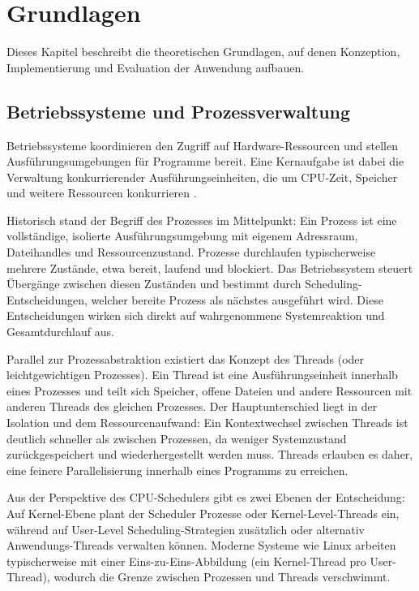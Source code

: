 \chapter{Grundlagen}

Dieses Kapitel beschreibt die theoretischen Grundlagen, auf denen Konzeption, Implementierung und Evaluation der Anwendung aufbauen.

\section{Betriebssysteme und Prozessverwaltung}

Betriebssysteme koordinieren den Zugriff auf Hardware-Ressourcen und stellen Ausführungsumgebungen für Programme bereit. Eine Kernaufgabe ist dabei die Verwaltung konkurrierender Ausführungseinheiten, die um CPU-Zeit, Speicher und weitere Ressourcen konkurrieren \cite{silberschatz2018operating,tanenbaum2014modern}.

Historisch stand der Begriff des Prozesses im Mittelpunkt: Ein Prozess ist eine vollständige, isolierte Ausführungsumgebung mit eigenem Adressraum, Dateihandles und Ressourcenzustand. Prozesse durchlaufen typischerweise mehrere Zustände, etwa bereit, laufend und blockiert. Das Betriebssystem steuert Übergänge zwischen diesen Zuständen und bestimmt durch Scheduling-Entscheidungen, welcher bereite Prozess als nächstes ausgeführt wird. Diese Entscheidungen wirken sich direkt auf wahrgenommene Systemreaktion und Gesamtdurchlauf aus.

Parallel zur Prozessabstraktion existiert das Konzept des Threads (oder leichtgewichtigen Prozesses). Ein Thread ist eine Ausführungseinheit innerhalb eines Prozesses und teilt sich Speicher, offene Dateien und andere Ressourcen mit anderen Threads des gleichen Prozesses. Der Hauptunterschied liegt in der Isolation und dem Ressourcenaufwand: Ein Kontextwechsel zwischen Threads ist deutlich schneller als zwischen Prozessen, da weniger Systemzustand zurückgespeichert und wiederhergestellt werden muss. Threads erlauben es daher, eine feinere Parallelisierung innerhalb eines Programms zu erreichen.

Aus der Perspektive des CPU-Schedulers gibt es zwei Ebenen der Entscheidung: Auf Kernel-Ebene plant der Scheduler Prozesse oder Kernel-Level-Threads ein, während auf User-Level Scheduling-Strategien zusätzlich oder alternativ Anwendungs-Threads verwalten können. Moderne Systeme wie Linux arbeiten typischerweise mit einer Eins-zu-Eins-Abbildung (ein Kernel-Thread pro User-Thread), wodurch die Grenze zwischen Prozessen und Threads verschwimmt.

